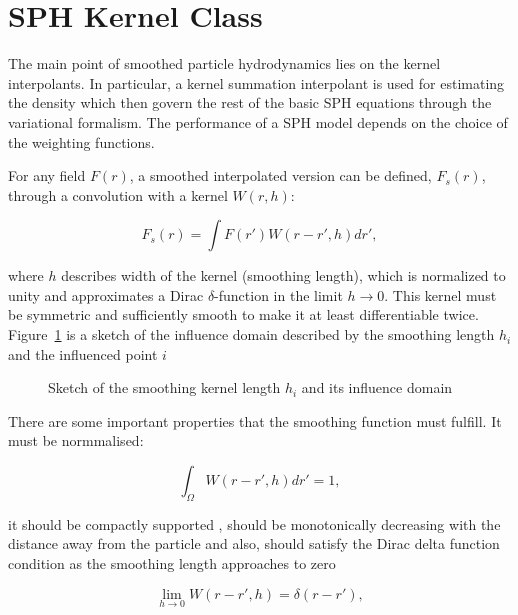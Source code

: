 \section{SPH Kernel Class}
\label{sec:section 5}

The main point of smoothed particle hydrodynamics lies on the kernel interpolants. In particular, a kernel summation interpolant is used for estimating the density
which then govern the rest of the basic SPH equations through the variational formalism. The performance of a SPH model depends on the choice of the weighting functions. \par
For any field $F(r)$, a smoothed interpolated version can be defined, $F_{s}(r)$, through a convolution with a kernel $W(r,h)$:

\begin{equation}
 F_{s}(r) = \int F(r') W(r-r',h)dr' ,
\end{equation}

where $h$ describes width of the kernel (smoothing length), which is normalized to unity and approximates a Dirac $\delta$-function in the limit $h\rightarrow 0$. This kernel must be symmetric
and sufficiently smooth to make it at least differentiable twice. Figure~\ref{fig:Bild3.9} is a sketch of the influence domain described by the smoothing length $h_{i}$ and the influenced
point $i$


\begin{figure}[H]
\centering
  \begin{footnotesize}
  
  \caption[Sketch of the smoothing kernel length $h_{i}$ and its influence domainSketch of the smoothing kernel length $h_{i}$ and its influence domain]{Sketch of the smoothing kernel length $h_{i}$ and its influence domain}
  \label{fig:Bild3.9}
  \end{footnotesize}
\end{figure} 

There are some important properties that the smoothing function must fulfill. It must be normmalised:

\begin{equation}
 \int_{\Omega}W(r-r',h)dr'= 1 ,
\end{equation}

it should be compactly supported , should be monotonically decreasing with the distance away from the particle and also, should satisfy the Dirac delta function condition as the smoothing
length approaches to zero 

\begin{equation}
 \lim_{h\to 0} W(r-r',h)= \delta(r-r') ,
\end{equation}

